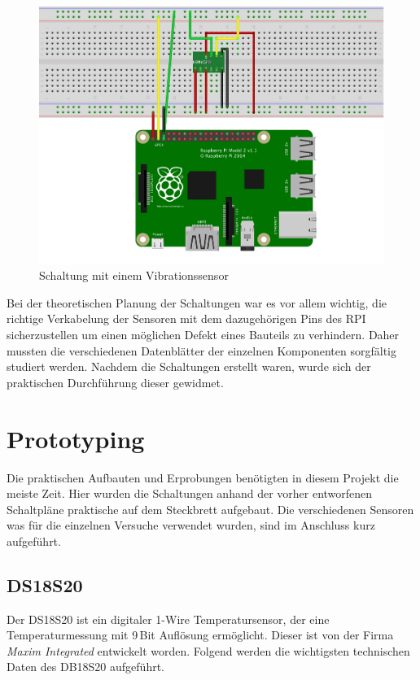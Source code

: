 \begin{figure}[!h] 
  \centering
     \includegraphics[scale=.4]{BilderAllgemein/Schaltung_Vib.png}
  \caption{Schaltung mit einem Vibrationssensor}
 
\end{figure}

Bei der theoretischen Planung der Schaltungen war es vor allem wichtig, die richtige Verkabelung der Sensoren mit dem dazugehörigen Pins des RPI sicherzustellen um einen möglichen Defekt eines Bauteils zu verhindern. Daher mussten die verschiedenen Datenblätter der einzelnen Komponenten sorgfältig studiert werden. Nachdem die Schaltungen erstellt waren, wurde sich der praktischen Durchführung dieser gewidmet.

\section{Prototyping}
\label{Prototyping}
Die praktischen Aufbauten und Erprobungen benötigten in diesem Projekt die meiste Zeit. Hier wurden die Schaltungen anhand der vorher entworfenen Schaltpläne praktische auf dem Steckbrett aufgebaut. Die verschiedenen Sensoren was für die einzelnen Versuche verwendet wurden, sind im Anschluss kurz aufgeführt.

\subsection*{DS18S20}
\label{subsection_DS18S20}
Der DS18S20  ist ein digitaler 1-Wire Temperatursensor, der eine Temperaturmessung mit 9\,Bit Auflösung ermöglicht. Dieser ist von der Firma \textit{Maxim Integrated} entwickelt worden.
Folgend werden die wichtigsten technischen Daten des DB18S20 aufgeführt.

